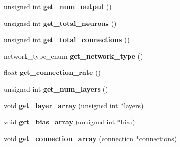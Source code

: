 \begin{DoxyCompactItemize}
\item 
\hypertarget{class_f_a_n_n_1_1neural__net_a4bab42eaace2cdc1041a47de1c2b298b}{unsigned int {\bfseries get\-\_\-num\-\_\-output} ()}\label{class_f_a_n_n_1_1neural__net_a4bab42eaace2cdc1041a47de1c2b298b}

\item 
\hypertarget{class_f_a_n_n_1_1neural__net_a7f1a55f856bb9c6b6bb121d63dda040d}{unsigned int {\bfseries get\-\_\-total\-\_\-neurons} ()}\label{class_f_a_n_n_1_1neural__net_a7f1a55f856bb9c6b6bb121d63dda040d}

\item 
\hypertarget{class_f_a_n_n_1_1neural__net_a11a04b644984228cadb22290a01b0b3b}{unsigned int {\bfseries get\-\_\-total\-\_\-connections} ()}\label{class_f_a_n_n_1_1neural__net_a11a04b644984228cadb22290a01b0b3b}

\item 
\hypertarget{class_f_a_n_n_1_1neural__net_aef5f255298fdb0e9002846207af57cf1}{network\-\_\-type\-\_\-enum {\bfseries get\-\_\-network\-\_\-type} ()}\label{class_f_a_n_n_1_1neural__net_aef5f255298fdb0e9002846207af57cf1}

\item 
\hypertarget{class_f_a_n_n_1_1neural__net_a721c1f52b047d86c4c72b45383bcf9de}{float {\bfseries get\-\_\-connection\-\_\-rate} ()}\label{class_f_a_n_n_1_1neural__net_a721c1f52b047d86c4c72b45383bcf9de}

\item 
\hypertarget{class_f_a_n_n_1_1neural__net_a78bd4aafadd679851bd566f27be3d8e5}{unsigned int {\bfseries get\-\_\-num\-\_\-layers} ()}\label{class_f_a_n_n_1_1neural__net_a78bd4aafadd679851bd566f27be3d8e5}

\item 
\hypertarget{class_f_a_n_n_1_1neural__net_af6cc05055ae06f83a95656ad512c1343}{void {\bfseries get\-\_\-layer\-\_\-array} (unsigned int $\ast$layers)}\label{class_f_a_n_n_1_1neural__net_af6cc05055ae06f83a95656ad512c1343}

\item 
\hypertarget{class_f_a_n_n_1_1neural__net_ac0e80512d57cd8eda12c92baf71dfc4a}{void {\bfseries get\-\_\-bias\-\_\-array} (unsigned int $\ast$bias)}\label{class_f_a_n_n_1_1neural__net_ac0e80512d57cd8eda12c92baf71dfc4a}

\item 
\hypertarget{class_f_a_n_n_1_1neural__net_aafb79ba887858fef174b80dcabd0c0b1}{void {\bfseries get\-\_\-connection\-\_\-array} (\hyperlink{structfann__connection}{connection} $\ast$connections)}\label{class_f_a_n_n_1_1neural__net_aafb79ba887858fef174b80dcabd0c0b1}


\end{DoxyCompactItemize}
